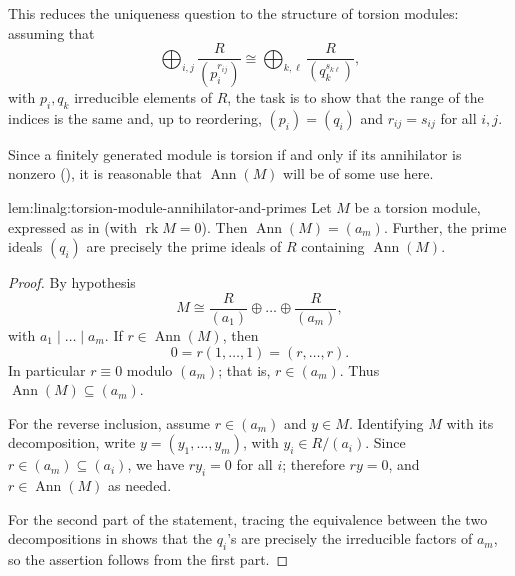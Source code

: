 This reduces the uniqueness question to the structure of torsion
modules: assuming that
\[
  \tag{*} \bigoplus_{i,j} \frac{R}{(p_i^{r_{ij}})} \cong
  \bigoplus_{k,\ell} \frac{R}{(q_k^{s_{k\ell}})},
\]
with $p_i, q_k$ irreducible elements of $R$, the task is to show that
the range of the indices is the same and, up to reordering,
$(p_i) = (q_i)$ and $r_{ij} = s_{ij}$ for all $i, j$.

Since a finitely generated module is torsion if and only if its
annihilator is nonzero
(), it is
reasonable that $\operatorname{Ann}(M)$ will be of some use here.
\begin{lem}{}{lem:linalg:torsion-module-annihilator-and-primes}
  Let $M$ be a torsion module, expressed as in  (with
  $\operatorname{rk} M = 0$). Then $\operatorname{Ann}(M) = (a_m)$.
  Further, the prime ideals $(q_i)$ are precisely the prime ideals of
  $R$ containing $\operatorname{Ann}(M)$.
\end{lem}
\begin{proof}
  By hypothesis
  \[
    M \cong \frac{R}{(a_1)} \oplus \dots \oplus \frac{R}{(a_m)},
  \]
  with $a_1 \mid \dots \mid a_m$. If $r \in \operatorname{Ann}(M)$,
  then
  \[
    0 = r(1, \dots, 1) = (r, \dots, r).
  \]
  In particular $r \equiv 0$ modulo $(a_m)$; that is, $r \in
  (a_m)$. Thus $\operatorname{Ann}(M) \subseteq (a_m)$.

  For the reverse inclusion, assume $r \in (a_m)$ and $y \in M$.
  Identifying $M$ with its decomposition, write
  $y = (y_1, \dots, y_m)$, with $y_i \in R/(a_i)$. Since
  $r \in (a_m) \subseteq (a_i)$, we have $ry_i = 0$ for all $i$;
  therefore $ry = 0$, and $r \in \operatorname{Ann}(M)$ as needed.

  For the second part of the statement, tracing the equivalence
  between the two decompositions in  shows that the
  $q_i$'s are precisely the irreducible factors of $a_m$, so the
  assertion follows from the first part.
\end{proof}

